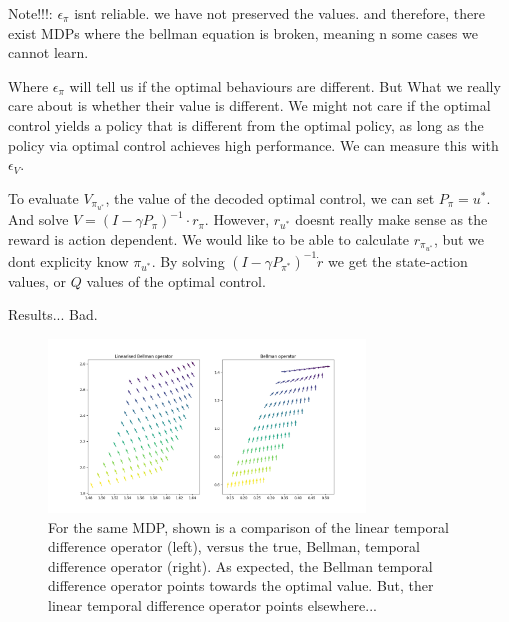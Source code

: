 {\color{red}Note!!!: $\epsilon_{\pi}$ isnt reliable. we have not preserved the values.
and therefore, there exist MDPs where the bellman equation is broken, meaning n some cases we cannot learn.}

Where $\epsilon_{\pi}$ will tell us if the optimal behaviours are different. But What we really care about
is whether their value is different. We might not care if the optimal control
yields a policy that is different from the optimal policy, as long as the
policy via optimal control achieves high performance. We can measure this with $\epsilon_{V}$.

To evaluate $V_{\pi_{u^{* }}}$, the value of the decoded optimal control, we can
set $P_{\pi} = u^{* }$. And solve $V = (I - \gamma P_{\pi})^{-1} \cdot r_{\pi}$.
However, $r_{u^{* }}$ doesnt really make sense as the reward is action
dependent. We would like to be able to calculate $r_{\pi_{u^{* } }}$, but we dont
explicity know \(\pi_{u^{* }}\). By solving $(I - \gamma P_{\pi^{* }})^{-1} \dot r$
we get the state-action values, or $Q$ values of the optimal control.

Results... Bad.

\begin{figure}
\centering
\includegraphics[width=0.75\textwidth,height=0.5\textheight]{../../pictures/figures/LBO_BO.png}
\caption{For the same MDP, shown is a comparison of the linear temporal difference operator (left), versus the true, Bellman, temporal difference operator (right). As expected, the Bellman temporal difference operator points towards the optimal value. But, ther linear temporal difference operator points elsewhere...}
\end{figure}

